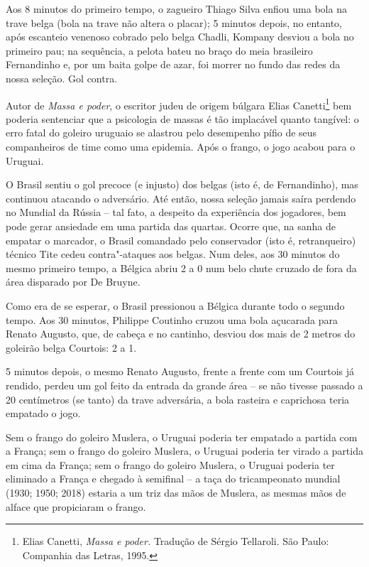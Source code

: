 Aos 8 minutos do primeiro tempo, o zagueiro Thiago Silva enfiou uma bola
na trave belga (bola na trave não altera o placar); 5 minutos depois, no
entanto, após escanteio venenoso cobrado pelo belga Chadli, Kompany
desviou a bola no primeiro pau; na sequência, a pelota bateu no braço do
meia brasileiro Fernandinho e, por um baita golpe de azar, foi morrer no
fundo das redes da nossa seleção. Gol contra.

Autor de \emph{Massa e poder}, o escritor judeu de origem búlgara Elias
Canetti\footnote{Elias Canetti, \emph{Massa e poder.} Tradução de Sérgio
  Tellaroli. São Paulo: Companhia das Letras, 1995.} bem poderia
sentenciar que a psicologia de massas é tão implacável quanto tangível:
o erro fatal do goleiro uruguaio se alastrou pelo desempenho pífio de
seus companheiros de time como uma epidemia. Após o frango, o jogo
acabou para o Uruguai.

O Brasil sentiu o gol precoce (e injusto) dos belgas (isto é, de
Fernandinho), mas continuou atacando o adversário. Até então, nossa
seleção jamais saíra perdendo no Mundial da Rússia -- tal fato, a
despeito da experiência dos jogadores, bem pode gerar ansiedade em uma
partida das quartas. Ocorre que, na sanha de empatar o marcador, o
Brasil comandado pelo conservador (isto é, retranqueiro) técnico Tite
cedeu contra"-ataques aos belgas. Num deles, aos 30 minutos do mesmo
primeiro tempo, a Bélgica abriu 2 a 0 num belo chute cruzado de fora da
área disparado por De Bruyne.

Como era de se esperar, o Brasil pressionou a Bélgica durante todo o
segundo tempo. Aos 30 minutos, Philippe Coutinho cruzou uma bola
açucarada para Renato Augusto, que, de cabeça e no cantinho, desviou dos
mais de 2 metros do goleirão belga Courtois: 2 a 1.

5 minutos depois, o mesmo Renato Augusto, frente a frente com um
Courtois já rendido, perdeu um gol feito da entrada da grande área -- se
não tivesse passado a 20 centímetros (se tanto) da trave adversária, a
bola rasteira e caprichosa teria empatado o jogo.

Sem o frango do goleiro Muslera, o Uruguai poderia ter empatado a
partida com a França; sem o frango do goleiro Muslera, o Uruguai poderia
ter virado a partida em cima da França; sem o frango do goleiro Muslera,
o Uruguai poderia ter eliminado a França e chegado à semifinal -- a taça
do tricampeonato mundial (1930; 1950; 2018) estaria a um triz das mãos
de Muslera, as mesmas mãos de alface que propiciaram o frango.

